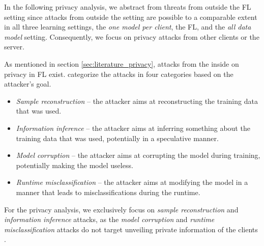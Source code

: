 In the following privacy analysis, we abstract from threats from outside the FL setting since attacks from outside the setting are possible to a comparable extent in all three learning settings, the \emph{one model per client}, the FL, and the \emph{all data model} setting. Consequently, we focus on privacy attacks from other clients or the server.

As mentioned in section \ref{sec:literature_privacy}, attacks from the inside on privacy in FL exist. \citet{enthoven2021overview} categorize the attacks in four categories based on the attacker's goal.
\begin{itemize}
    \item \emph{Sample reconstruction} -- the attacker aims at reconstructing the training data that was used.
    \item \emph{Information inference} -- the attacker aims at inferring something about the training data that was used, potentially in a speculative manner.
    \item \emph{Model corruption} -- the attacker aims at corrupting the model during training, potentially making the model useless.
    \item \emph{Runtime misclassification} -- the attacker aims at modifying the model in a manner that leads to misclassifications during the runtime.
\end{itemize}
For the privacy analysis, we exclusively focus on \emph{sample reconstruction} and \emph{information inference} attacks, as the \emph{model corruption} and \emph{runtime misclassification} attacks do not target unveiling private information of the clients \citep{enthoven2021overview}.

